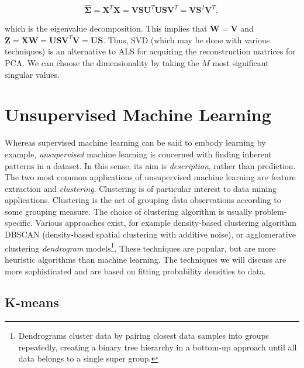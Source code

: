 \documentclass[11pt]{amsart}
\begin{document}
$$\hat{\boldsymbol\Sigma} = \mathbf{X}^T\mathbf{X} = \mathbf{V}\mathbf{S}\mathbf{U}^T\mathbf{U}\mathbf{S}\mathbf{V}^T =  \mathbf{V}\mathbf{S}^2\mathbf{V}^T,$$

which is the eigenvalue decomposition. This implies that $\mathbf{W} = \mathbf{V}$ and $\mathbf{Z} = \mathbf{X}\mathbf{W} = \mathbf{U}\mathbf{S}\mathbf{V}^T\mathbf{V} = \mathbf{U}\mathbf{S}$. Thus, SVD (which may be done with various techniques) is an alternative to ALS for acquiring the reconstruction matrices for PCA. We can choose the dimensionality by taking the $M$ most significant singular values.

\section{Unsupervised Machine Learning}

Whereas supervised machine learning can be said to embody learning by example, \emph{unsupervised} machine learning is concerned with finding inherent patterns in a dataset. In this sense, its aim is \emph{description}, rather than prediction. The two most common applications of unsupervised machine learning are feature extraction and \emph{clustering}. Clustering is of particular interest to data mining applications. Clustering is the act of grouping data observations according to some grouping measure. The choice of clustering algorithm is usually problem-specific. Various approaches exist, for example density-based clustering algorithm DBSCAN (density-based spatial clustering with additive noise), or agglomerative clustering \emph{dendrogram} models\footnote{Dendrograms cluster data by pairing closest data samples into groups repeatedly, creating a binary tree hierarchy in a bottom-up approach until all data belongs to a single super group.}. These techniques are popular, but are more heuristic algorithms than machine learning. The techniques we will discuss are more sophisticated and are based on fitting probability densities to data.

\subsection{K-means}
\end{document}
